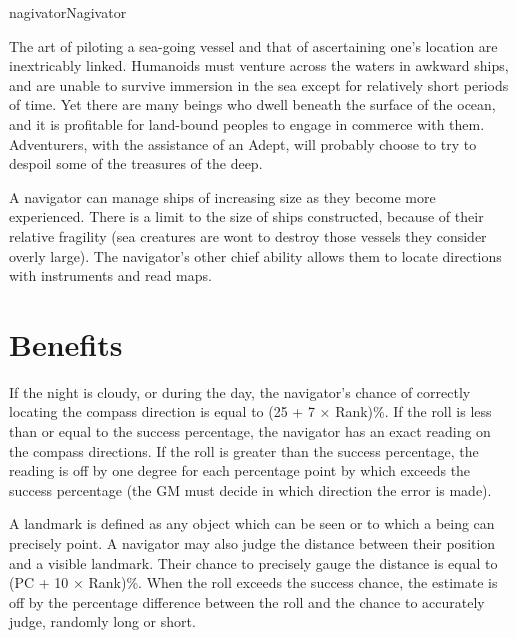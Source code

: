 \begin{Skill}[1.1]{nagivator}{Nagivator}

The art of piloting a sea-going vessel and that of ascertaining one’s
location are inextricably linked.  Humanoids must venture across the
waters in awkward ships, and are unable to survive immersion in the
sea except for relatively short periods of time. Yet there are many
beings who dwell beneath the surface of the ocean, and it is
profitable for land-bound peoples to engage in commerce with
them. Adventurers, with the assistance of an Adept, will probably
choose to try to despoil some of the treasures of the deep.

A navigator can manage ships of increasing size as they become more
experienced. There is a limit to the size of ships constructed,
because of their relative fragility (sea creatures are wont to destroy
those vessels they consider overly large).  The navigator’s other
chief ability allows them to locate directions with instruments and
read maps.

\section{Benefits}


If the night is cloudy, or during the day, the navigator’s chance of
correctly locating the compass direction is equal to (25 + 7 ×
Rank)\%.  If the roll is less than or equal to the success percentage,
the navigator has an exact reading on the compass directions.  If the
roll is greater than the success percentage, the reading is off by one
degree for each percentage point by which exceeds the success
percentage (the GM must decide in which direction the error is made).


A landmark is defined as any object which can be seen or to which a
being can precisely point.  A navigator may also judge the distance
between their position and a visible landmark. Their chance to
precisely gauge the distance is equal to (PC + 10 × Rank)\%.  When the
roll exceeds the success chance, the estimate is off by the percentage
difference between the roll and the chance to accurately judge,
randomly long or short.



\end{Skill}
